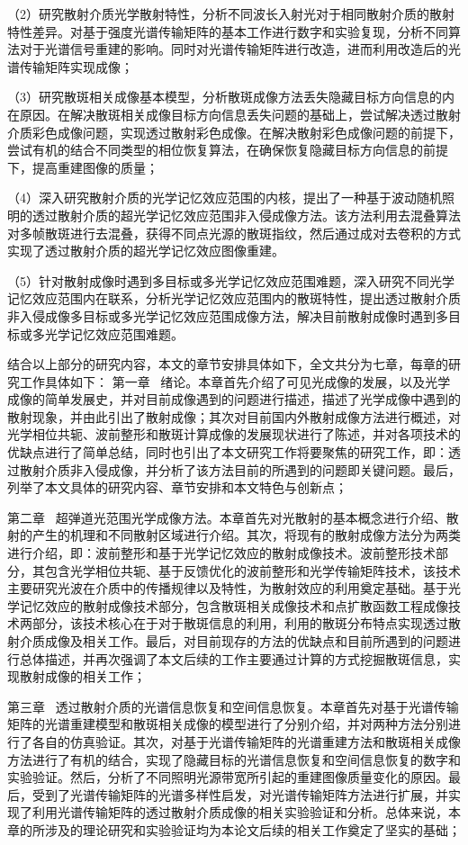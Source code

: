 （2）研究散射介质光学散射特性，分析不同波长入射光对于相同散射介质的散射特性差异。对基于强度光谱传输矩阵的基本工作进行数字和实验复现，分析不同算法对于光谱信号重建的影响。同时对光谱传输矩阵进行改造，进而利用改造后的光谱传输矩阵实现成像；

（3）研究散斑相关成像基本模型，分析散斑成像方法丢失隐藏目标方向信息的内在原因。在解决散斑相关成像目标方向信息丢失问题的基础上，尝试解决透过散射介质彩色成像问题，实现透过散射彩色成像。在解决散射彩色成像问题的前提下，尝试有机的结合不同类型的相位恢复算法，在确保恢复隐藏目标方向信息的前提下，提高重建图像的质量；

（4）深入研究散射介质的光学记忆效应范围的内核，提出了一种基于波动随机照明的透过散射介质的超光学记忆效应范围非入侵成像方法。该方法利用去混叠算法对多帧散斑进行去混叠，获得不同点光源的散斑指纹，然后通过成对去卷积的方式实现了透过散射介质的超光学记忆效应图像重建。

（5）针对散射成像时遇到多目标或多光学记忆效应范围难题，深入研究不同光学记忆效应范围内在联系，分析光学记忆效应范围内的散斑特性，提出透过散射介质非入侵成像多目标或多光学记忆效应范围成像方法，解决目前散射成像时遇到多目标或多光学记忆效应范围难题。

结合以上部分的研究内容，本文的章节安排具体如下，全文共分为七章，每章的研究工作具体如下：
第一章 \ 绪论。本章首先介绍了可见光成像的发展，以及光学成像的简单发展史，并对目前成像遇到的问题进行描述，描述了光学成像中遇到的散射现象，并由此引出了散射成像；其次对目前国内外散射成像方法进行概述，对光学相位共轭、波前整形和散斑计算成像的发展现状进行了陈述，并对各项技术的优缺点进行了简单总结，同时也引出了本文研究工作将要聚焦的研究工作，即：透过散射介质非入侵成像，并分析了该方法目前的所遇到的问题即关键问题。最后，列举了本文具体的研究内容、章节安排和本文特色与创新点；

第二章 \ 超弹道光范围光学成像方法。本章首先对光散射的基本概念进行介绍、散射的产生的机理和不同散射区域进行介绍。其次，将现有的散射成像方法分为两类进行介绍，即：波前整形和基于光学记忆效应的散射成像技术。波前整形技术部分，其包含光学相位共轭、基于反馈优化的波前整形和光学传输矩阵技术，该技术主要研究光波在介质中的传播规律以及特性，为散射效应的利用奠定基础。基于光学记忆效应的散射成像技术部分，包含散斑相关成像技术和点扩散函数工程成像技术两部分，该技术核心在于对于散斑信息的利用，利用的散斑分布特点实现透过散射介质成像及相关工作。最后，对目前现存的方法的优缺点和目前所遇到的问题进行总体描述，并再次强调了本文后续的工作主要通过计算的方式挖掘散斑信息，实现散射成像的相关工作；

第三章 \ 透过散射介质的光谱信息恢复和空间信息恢复。本章首先对基于光谱传输矩阵的光谱重建模型和散斑相关成像的模型进行了分别介绍，并对两种方法分别进行了各自的仿真验证。其次，对基于光谱传输矩阵的光谱重建方法和散斑相关成像方法进行了有机的结合，实现了隐藏目标的光谱信息恢复和空间信息恢复的数字和实验验证。然后，分析了不同照明光源带宽所引起的重建图像质量变化的原因。最后，受到了光谱传输矩阵的光谱多样性启发，对光谱传输矩阵方法进行扩展，并实现了利用光谱传输矩阵的透过散射介质成像的相关实验验证和分析。总体来说，本章的所涉及的理论研究和实验验证均为本论文后续的相关工作奠定了坚实的基础；

